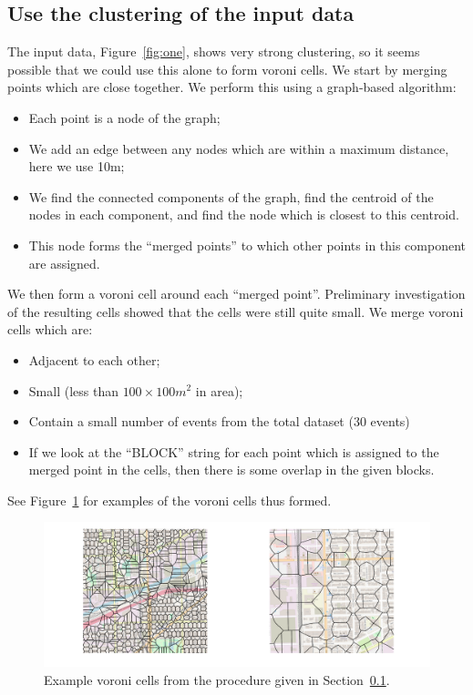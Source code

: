 \documentclass[twoside,a4paper,twocolumn,10pt]{article}
\theoremstyle{plain}
\theoremstyle{definition}
\begin{document}
\subsection{Use the clustering of the input data}\label{sec:chicago_vor_from_clusters}

The input data, Figure~\ref{fig:one}, shows very strong clustering, so it seems possible
that we could use this alone to form voroni cells.  We start by merging points which are
close together.  We perform this using a graph-based algorithm:
\begin{itemize}
\item Each point is a node of the graph;
\item We add an edge between any nodes which are within a maximum distance, here we use 10m;
\item We find the connected components of the graph, find the centroid of the nodes in
each component, and find the node which is closest to this centroid.
\item This node forms the ``merged points'' to which other points in this component are
assigned.
\end{itemize}
We then form a voroni cell around each ``merged point''.  Preliminary investigation of the
resulting cells showed that the cells were still quite small.  We merge voroni cells which
are:
\begin{itemize}
\item Adjacent to each other;
\item Small (less than $100\times 100 m^2$ in area);
\item Contain a small number of events from the total dataset (30 events)
\item If we look at the ``BLOCK'' string for each point which is assigned to the merged
point in the cells, then there is some overlap in the given blocks.
\end{itemize}
See Figure~\ref{fig:chicago_vor_3} for examples of the voroni cells thus formed.

\begin{figure}
  \includegraphics[width=\textwidth]{chiago_voroni_clustering_polys.png}
  \caption{Example voroni cells from the procedure given in
  Section~\ref{sec:chicago_vor_from_clusters}.}
  \label{fig:chicago_vor_3}
\end{figure}
\end{document}
